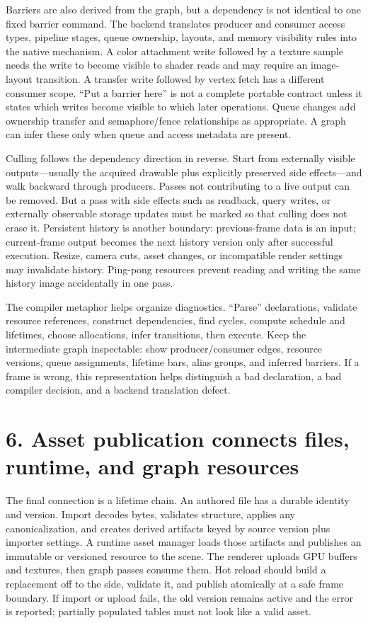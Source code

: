 Barriers are also derived from the graph, but a dependency is not identical to one fixed barrier command. The backend translates producer and consumer access types, pipeline stages, queue ownership, layouts, and memory visibility rules into the native mechanism. A color attachment write followed by a texture sample needs the write to become visible to shader reads and may require an image-layout transition. A transfer write followed by vertex fetch has a different consumer scope. ``Put a barrier here'' is not a complete portable contract unless it states which writes become visible to which later operations. Queue changes add ownership transfer and semaphore/fence relationships as appropriate. A graph can infer these only when queue and access metadata are present.

Culling follows the dependency direction in reverse. Start from externally visible outputs---usually the acquired drawable plus explicitly preserved side effects---and walk backward through producers. Passes not contributing to a live output can be removed. But a pass with side effects such as readback, query writes, or externally observable storage updates must be marked so that culling does not erase it. Persistent history is another boundary: previous-frame data is an input; current-frame output becomes the next history version only after successful execution. Resize, camera cuts, asset changes, or incompatible render settings may invalidate history. Ping-pong resources prevent reading and writing the same history image accidentally in one pass.

The compiler metaphor helps organize diagnostics. ``Parse'' declarations, validate resource references, construct dependencies, find cycles, compute schedule and lifetimes, choose allocations, infer transitions, then execute. Keep the intermediate graph inspectable: show producer/consumer edges, resource versions, queue assignments, lifetime bars, alias groups, and inferred barriers. If a frame is wrong, this representation helps distinguish a bad declaration, a bad compiler decision, and a backend translation defect.

\section{6. Asset publication connects files, runtime, and graph resources}\label{06-engine-ii-ch042-asset-publication-connects-files-runtime-and-graph-resources}

The final connection is a lifetime chain. An authored file has a durable identity and version. Import decodes bytes, validates structure, applies any canonicalization, and creates derived artifacts keyed by source version plus importer settings. A runtime asset manager loads those artifacts and publishes an immutable or versioned resource to the scene. The renderer uploads GPU buffers and textures, then graph passes consume them. Hot reload should build a replacement off to the side, validate it, and publish atomically at a safe frame boundary. If import or upload fails, the old version remains active and the error is reported; partially populated tables must not look like a valid asset.

